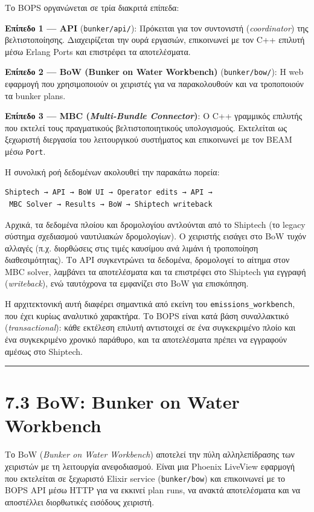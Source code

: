 Το BOPS οργανώνεται σε τρία διακριτά επίπεδα:

\textbf{Επίπεδο 1 --- API} (\texttt{bunker/api/}): Πρόκειται για τον
συντονιστή (\emph{coordinator}) της βελτιστοποίησης. Διαχειρίζεται την
ουρά εργασιών, επικοινωνεί με τον C++ επιλυτή μέσω Erlang Ports και
επιστρέφει τα αποτελέσματα.

\textbf{Επίπεδο 2 --- BoW (Bunker on Water Workbench)}
(\texttt{bunker/bow/}): Η web εφαρμογή που χρησιμοποιούν οι χειριστές
για να παρακολουθούν και να τροποποιούν τα bunker plans.

\textbf{Επίπεδο 3 --- MBC (\emph{Multi-Bundle Connector})}: Ο C++
γραμμικός επιλυτής που εκτελεί τους πραγματικούς βελτιστοποιητικούς
υπολογισμούς. Εκτελείται ως ξεχωριστή διεργασία του λειτουργικού
συστήματος και επικοινωνεί με τον BEAM μέσω \texttt{Port}.

Η συνολική ροή δεδομένων ακολουθεί την παρακάτω πορεία:

\begin{verbatim}
Shiptech → API → BoW UI → Operator edits → API →
 MBC Solver → Results → BoW → Shiptech writeback
\end{verbatim}

Αρχικά, τα δεδομένα πλοίου και δρομολογίου αντλούνται από το Shiptech
(το legacy σύστημα σχεδιασμού ναυτιλιακών δρομολογίων). Ο χειριστής
εισάγει στο BoW τυχόν αλλαγές (π.χ. διορθώσεις στις τιμές καυσίμου ανά
λιμάνι ή τροποποίηση διαθεσιμότητας). Το API συγκεντρώνει τα δεδομένα,
δρομολογεί το αίτημα στον MBC solver, λαμβάνει τα αποτελέσματα και τα
επιστρέφει στο Shiptech για εγγραφή (\emph{writeback}), ενώ ταυτόχρονα
τα εμφανίζει στο BoW για επισκόπηση.

Η αρχιτεκτονική αυτή διαφέρει σημαντικά από εκείνη του
\texttt{emissions\_workbench}, που έχει κυρίως αναλυτικό χαρακτήρα. Το
BOPS είναι κατά βάση συναλλακτικό (\emph{transactional}): κάθε εκτέλεση
επιλυτή αντιστοιχεί σε ένα συγκεκριμένο πλοίο και ένα συγκεκριμένο
χρονικό παράθυρο, και τα αποτελέσματα πρέπει να εγγραφούν αμέσως στο
Shiptech.

\begin{center}\rule{0.5\linewidth}{0.5pt}\end{center}

\section{7.3 BoW: Bunker on Water
Workbench}\label{bow-bunker-on-water-workbench}

Το BoW (\emph{Bunker on Water Workbench}) αποτελεί την πύλη
αλληλεπίδρασης των χειριστών με τη λειτουργία ανεφοδιασμού. Είναι μια
Phoenix LiveView εφαρμογή που εκτελείται σε ξεχωριστό Elixir service
(\texttt{bunker/bow}) και επικοινωνεί με το BOPS API μέσω HTTP για να
εκκινεί plan runs, να ανακτά αποτελέσματα και να αποστέλλει διορθωτικές
εισόδους χειριστή.

